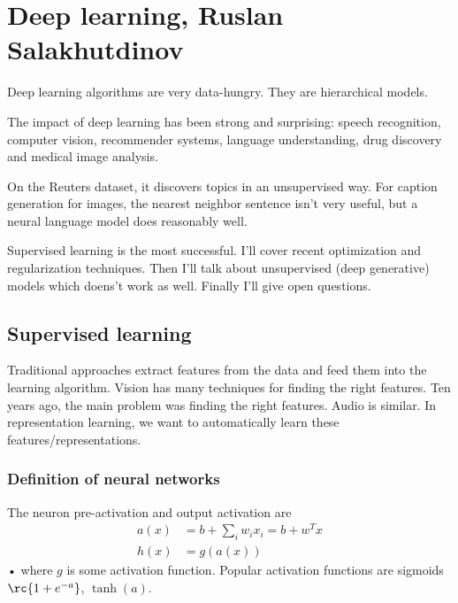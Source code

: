 \section{Deep learning, Ruslan Salakhutdinov}


Deep learning algorithms are very data-hungry. They are hierarchical models. 

The impact of deep learning has been strong and surprising: speech recognition, computer vision, recommender systems, language understanding, drug discovery and medical image analysis. %

On the Reuters dataset, it discovers topics in an unsupervised way. 
For caption generation for images, the nearest neighbor sentence isn't very useful, but a neural language model does reasonably well.

Supervised learning is the most successful. I'll cover recent optimization and regularization techniques. Then I'll talk about unsupervised (deep generative) models which doens't work as well. Finally I'll give open questions.


\subsection{Supervised learning}

Traditional approaches extract features from the data and feed them into the learning algorithm. Vision has many techniques for finding the right features. Ten years ago, the main problem was finding the right features.  Audio is similar. %
In representation learning, we want to automatically learn these features/representations. 



\subsubsection{Definition of neural networks}

The neuron pre-activation and output activation are
\begin{align}
a(x) &= b+ \sum_i w_i x_i = b+ w^Tx\\
h(x) &=g(a(x))
\end{align}•
where $g$ is some activation function. Popular activation functions are sigmoids $\rc{1+e^{-a}}$, $\tanh(a)$. 


